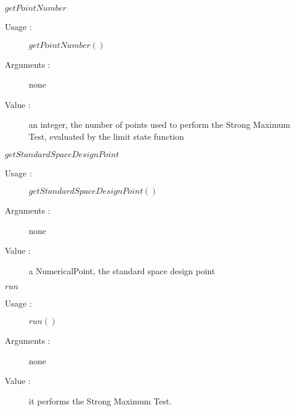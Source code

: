 \begin{description}
\begin{description}
  \item $getPointNumber$
    \begin{description}
    \item[Usage :] $getPointNumber()$
    \item[Arguments :] none
    \item[Value :]  an integer, the number of points used to perform the Strong Maximum Test, evaluated by the limit state function
    \end{description}
    \bigskip

  \item $getStandardSpaceDesignPoint$
    \begin{description}
    \item[Usage :] $getStandardSpaceDesignPoint()$
    \item[Arguments :] none
    \item[Value :]  a NumericalPoint, the standard space design point
    \end{description}
    \bigskip

  \item $run$
    \begin{description}
    \item[Usage :] $run()$
    \item[Arguments :] none
    \item[Value :]  it performs the Strong Maximum Test.
    \end{description}
    \bigskip

  \end{description}

\end{description}
